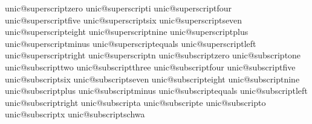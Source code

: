    unic@superscriptzero          {}
   unic@superscripti             {}
   unic@superscriptfour          {}
   unic@superscriptfive          {}
   unic@superscriptsix           {}
   unic@superscriptseven         {}
   unic@superscripteight         {}
   unic@superscriptnine          {}
   unic@superscriptplus          {\high{+}}
   unic@superscriptminus         {\high{\textminus}}
   unic@superscriptequals        {\high{=}}
   unic@superscriptleft          {\high{(}}
   unic@superscriptright         {\high{)}}
   unic@superscriptn             {}
   unic@subscriptzero            {}
   unic@subscriptone             {}
   unic@subscripttwo             {}
   unic@subscriptthree           {}
   unic@subscriptfour            {}
   unic@subscriptfive            {}
   unic@subscriptsix             {}
   unic@subscriptseven           {}
   unic@subscripteight           {}
   unic@subscriptnine            {}
   unic@subscriptplus            {\low{+}}
   unic@subscriptminus           {\low{\textminus}}
   unic@subscriptequals          {\low{=}}
   unic@subscriptleft            {\low{(}}
   unic@subscriptright           {\low{)}}
   unic@subscripta               {}
   unic@subscripte               {}
   unic@subscripto               {}
   unic@subscriptx               {}
   unic@subscriptschwa           {\low{\schwa}}

\stopencoding

\endinput
